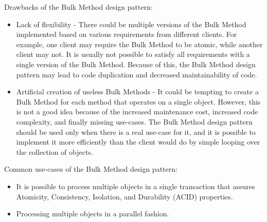 Drawbacks of the Bulk Method design pattern:

\begin{itemize}
    \item Lack of flexibility - There could be multiple versions of the Bulk Method implemented based on
    various requirements from different clients.
    For example, one client may require the Bulk Method to be atomic, while another client may not.
    It is usually not possible to satisfy all requirements with a single version of the Bulk Method.
    Because of this, the Bulk Method design pattern may lead to code duplication and decreased maintainability of code.
    \item Artificial creation of useless Bulk Methods - It could be tempting to create a Bulk Method for each
    method that operates on a single object.
    However, this is not a good idea because of the increased maintenance cost, increased code complexity,
    and finally missing use-cases.
    The Bulk Method design pattern should be used only when there is a real use-case for it, and it is possible
    to implement it more efficiently than the client would do by simple looping over the collection of objects.
\end{itemize}

Common use-cases of the Bulk Method design pattern:

\begin{itemize}
    \item It is possible to process multiple objects in a single transaction that assures Atomicity, Consistency,
    Isolation, and Durability (ACID) properties.
    \item Processing multiple objects in a parallel fashion.
\end{itemize}

